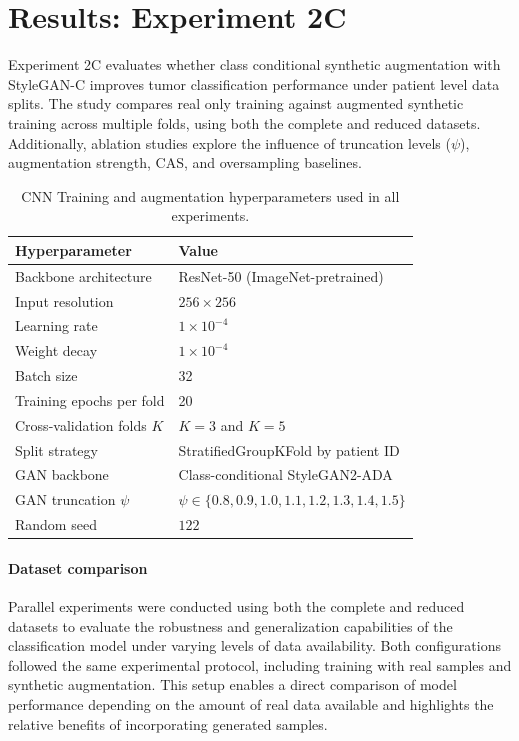 \clearpage


\section{Results: Experiment 2C}
\label{sec:results-augmentation}



Experiment 2C evaluates whether class conditional synthetic augmentation with StyleGAN-C improves tumor classification performance under patient level data splits. The study compares real only training against augmented synthetic training across multiple folds, using both the complete and reduced datasets. Additionally, ablation studies explore the influence of truncation levels (\(\psi\)), augmentation strength, CAS, and oversampling baselines.


\begin{table}[ht]
\centering
\caption{CNN Training and augmentation hyperparameters used in all experiments.}
\label{tab:hyperparams}
\begin{tabular}{ll}
\toprule
Hyperparameter                    & Value \\
\midrule
Backbone architecture            & ResNet-50 (ImageNet-pretrained) \\
Input resolution                 & $256\times256$\\
Learning rate                    & $1\times10^{-4}$ \\
Weight decay                     & $1\times10^{-4}$ \\
Batch size                       & 32 \\
Training epochs per fold         & 20 \\
Cross-validation folds $K$       & $K=3$ and $K=5$  \\
Split strategy                   & StratifiedGroupKFold by patient ID \\
GAN backbone                     & Class-conditional StyleGAN2-ADA \\
GAN truncation $\psi$           & $\psi \in \{0.8,0.9,1.0,1.1,1.2,1.3, 1.4, 1.5\}$  \\
Random seed                      & $122$ \\
\bottomrule
\end{tabular}
\end{table}

\paragraph{Dataset comparison}
Parallel experiments were conducted using both the complete and reduced datasets to evaluate the robustness and generalization capabilities of the classification model under varying levels of data availability. Both configurations followed the same experimental protocol, including training with real samples and synthetic augmentation. This setup enables a direct comparison of model performance depending on the amount of real data available and highlights the relative benefits of incorporating generated samples.

